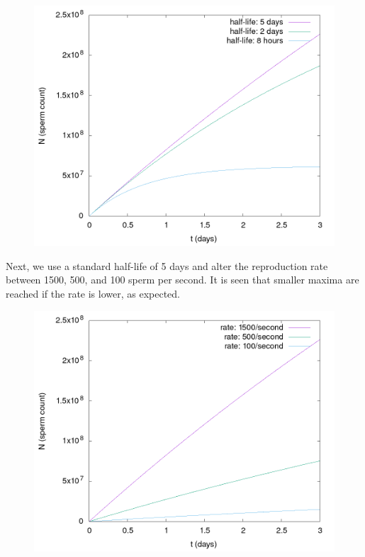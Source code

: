 \documentclass[12pt]{article}
\begin{document}
\begin{figure}[H]
\includegraphics[scale=0.5]{./output.png}
\end{figure}

Next, we use a standard half-life of 5 days and alter the reproduction rate between 1500, 500, and 100 sperm per second. It is seen that smaller maxima are reached if the rate is lower, as expected.

\begin{figure}[H] 
\includegraphics[scale=0.5]{./output1.png}
\end{figure}
\end{document}
